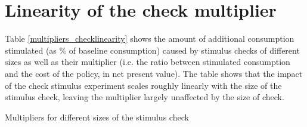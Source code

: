 \appendix
\section{Linearity of the check multiplier}

Table \ref{multipliers_checklinearity} shows the amount of additional consumption stimulated (as \% of baseline consumption) caused by stimulus checks of different sizes as well as their multiplier (i.e. the ratio between stimulated consumption and the cost of the policy, in net present value). The table shows that the impact of the check stimulus experiment scales roughly linearly with the size of the stimulus check, leaving the multiplier largely unaffected by the size of check.

\begin{table} 
	\center
	
	\caption{Multipliers for different sizes of the stimulus check}
	\label{multipliers_checklinearity}
\end{table}